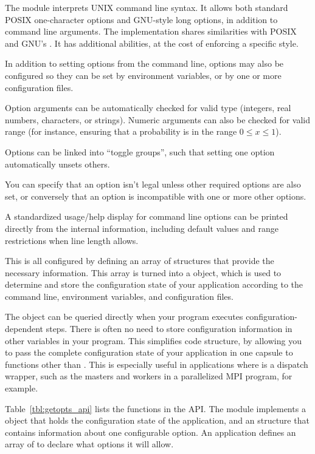 The  module interprets UNIX command line syntax. It
allows both standard POSIX one-character options and GNU-style long
options, in addition to command line arguments. The implementation
shares similarities with POSIX  and GNU's
. It has additional abilities, at the cost of
enforcing a specific style.

In addition to setting options from the command line, options may also
be configured so they can be set by environment variables, or by one
or more configuration files.

Option arguments can be automatically checked for valid type
(integers, real numbers, characters, or strings). Numeric arguments
can also be checked for valid range (for instance, ensuring that a
probability is in the range $0 \leq x \leq 1$).

Options can be linked into ``toggle groups'', such that setting one
option automatically unsets others. 

You can specify that an option isn't legal unless other required
options are also set, or conversely that an option is incompatible
with one or more other options.

A standardized usage/help display for command line options can be
printed directly from the internal information, including default
values and range restrictions when line length allows.

This is all configured by defining an array of 
structures that provide the necessary information. This array is
turned into a  object, which is used to determine
and store the configuration state of your application according to the
command line, environment variables, and configuration files.

The  object can be queried directly when your
program executes configuration-dependent steps. There is often no need
to store configuration information in other variables in your
program. This simplifies code structure, by allowing you to pass the
complete configuration state of your application in one capsule to
functions other than . This is especially useful in
applications where  is a dispatch wrapper, such as the
masters and workers in a parallelized MPI program, for example.

Table~\ref{tbl:getopts_api} lists the functions in the
 API. The module implements a 
object that holds the configuration state of the application, and an
 structure that contains information about one
configurable option. An application defines an array of
 to declare what options it will allow.

